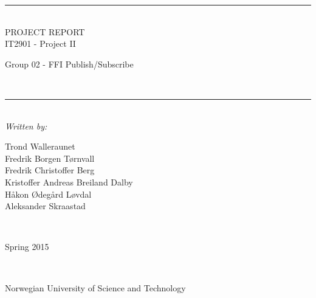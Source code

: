 \thispagestyle{empty}
\begin{center}
\noindent\rule{\textwidth}{0.5pt}
\\[1pc]
\Huge{PROJECT REPORT}
\\[1pc]
\large{IT2901 - Project II}
\\[1pc]
\begin{small}
\begin{bf}Group 02 - FFI Publish/Subscribe\end{bf}
\end{small}
\\[1pc]
\noindent\rule{\textwidth}{0.5pt}
\\[5pc]
\textit{Written by:}
\\[1pc]
\begin{small}
Trond Walleraunet\\Fredrik Borgen Tørnvall\\Fredrik Christoffer Berg\\Kristoffer Andreas Breiland Dalby\\Håkon Ødegård Løvdal\\Aleksander Skraastad \\
\end{small}
\\[7pc]
\begin{bf}
Spring 2015
\end{bf}
\\[8pc]

\noindent{}

\begin{small}Norwegian University of Science and Technology\end{small}

\end{center}

\pagebreak